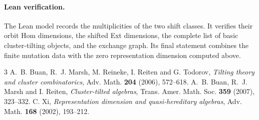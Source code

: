 \documentclass[11pt]{article}
\begin{document}
\paragraph{Lean verification.} The Lean model records the multiplicities
of the two shift classes. It verifies their orbit Hom dimensions, the
shifted Ext dimensions, the complete list of basic cluster-tilting
objects, and the exchange graph. Its final statement combines the finite
mutation data with the zero representation dimension computed above.

\begin{thebibliography}{3}
 A.~B. Buan, R.~J. Marsh, M. Reineke, I. Reiten and
G. Todorov, \emph{Tilting theory and cluster combinatorics}, Adv. Math.
\textbf{204} (2006), 572--618.
 A.~B. Buan, R.~J. Marsh and I. Reiten,
\emph{Cluster-tilted algebras}, Trans. Amer. Math. Soc. \textbf{359}
(2007), 323--332.
 C. Xi, \emph{Representation dimension and quasi-hereditary
algebras}, Adv. Math. \textbf{168} (2002), 193--212.
\end{thebibliography}
\end{document}
